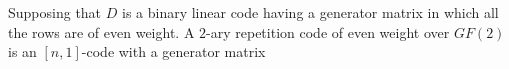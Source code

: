 \qsubpart
\begin{comment}
Supposing that $D$ is a binary linear code having a generator matrix
in which all the rows are of even weight. Then, to prove that all the codewords of $D$ have even weight consider the following.

\[
	w(\bm{a} + \bm{b}) = w(\bm{a}) + w(\bm{b}) - 2w(\bm{a} \cap \bm{b})
\]
\begin{align*}
	w\left(\bm{a} + \bm{b} + \bm{c}\right) &= w(\bm{a} + \bm{b}) + w(\bm{c}) -2w((\bm{a} + \bm{b})\cap \bm{c})\\
&=w(\bm{a}) + w(\bm{b}) - 2w(\bm{a} \cap \bm{b}) + w(\bm{c}) -2w((\bm{a} + \bm{b})\cap \bm{c})\\
&=w(\bm{a}) + w(\bm{b}) + w(\bm{c}) - 2w(\bm{a} \cap \bm{b})  -2w((\bm{a} + \bm{b})\cap \bm{c})\\
&=w(\bm{a}) + w(\bm{b}) + w(\bm{c}) - 2w(\bm{a}\cdot\bm{b})  -2w(\bm{a}\cdot \bm{c} + \bm{b}\cdot \bm{c})\\
&=w(\bm{a}) + w(\bm{b}) + w(\bm{c}) - 2w(\bm{a}\bm{b})  -2w(\bm{a}\bm{c} + \bm{b}\bm{c})\\
\end{align*}
\begin{align*}
	w\left((\bm{a} + \bm{b} + \bm{c}) + \bm{d}\right) &= w(\bm{a} + \bm{b} + \bm{c}) + w(\bm{d}) -2w((\bm{a} + \bm{b} + \bm{c})\cap \bm{d})
\end{align*}	
\begin{align*}
	&= w(\bm{a}) + w(\bm{b}) + w(\bm{c}) - 2w(\bm{a}\bm{b})  -2w(\bm{a}\bm{c} + \bm{b}\bm{c})+ w(\bm{d}) -2w((\bm{a} + \bm{b} + \bm{c})\cap \bm{d})\\
	&= w(\bm{a}) + w(\bm{b}) + w(\bm{c}) + w(\bm{d}) - 2w(\bm{a}\bm{b})  -2w(\bm{a}\bm{c} + \bm{b}\bm{c})-2w((\bm{a} + \bm{b} + \bm{c})\cap \bm{d})\\
	&= w(\bm{a}) + w(\bm{b}) + w(\bm{c}) + w(\bm{d}) - 2w(\bm{a}\bm{b})  -2w(\bm{a}\bm{c} + \bm{b}\bm{c})-2w(\bm{a}\bm{d} + \bm{b}\bm{d} + \bm{c}\bm{d})\\
\end{align*}

Prove that, in a binary linear code, either all the 
codewords have even weight or exactly half have even weight
and half have odd weight.
\end{comment}
Supposing that $D$ is a binary linear code having a generator matrix
in which all the rows are of even weight. A $2$-ary repetition code of even weight over $GF(2)$ is an $[n,1]$-code with a generator matrix
